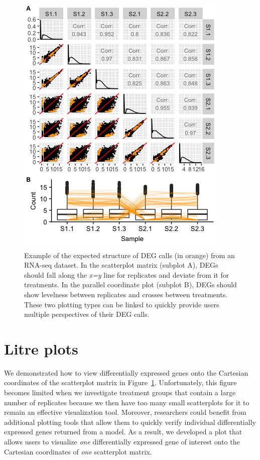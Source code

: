\documentclass{bioinfo}
\begin{document}
\begin{figure}[!tpb]
\centerline{\includegraphics[width=\columnwidth]{../MakeFigures/sbIRDEG.jpg}}
\caption{Example of the expected structure of DEG calls (in orange) from an RNA-seq dataset. In the scatterplot matrix (subplot A), DEGs should fall along the \textit{x=y} line for replicates and deviate from it for treatments. In the parallel coordinate plot (subplot B), DEGs should show levelness between replicates and crosses between treatments. These two plotting types can be linked to quickly provide users multiple perspectives of their DEG calls.
\label{sbIRDEG}}
\end{figure}

\section{Litre plots}

We demonstrated how to view differentially expressed genes onto the Cartesian coordinates of the scatterplot matrix in Figure~\ref{sbIRDEG}. Unfortunately, this figure becomes limited when we investigate treatment groups that contain a large number of replicates because we then have too many small scatterplots for it to remain an effective visualization tool. Moreover, researchers could benefit from additional plotting tools that allow them to quickly verify individual differentially expressed genes returned from a model. As a result, we developed a plot that allows users to visualize \textit{one} differentially expressed gene of interest onto the Cartesian coordinates of \textit{one} scatterplot matrix.
\end{document}
